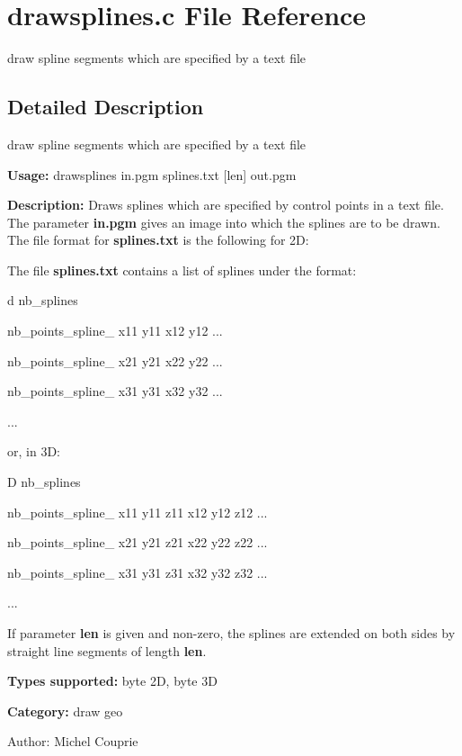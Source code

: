 \section{drawsplines.c File Reference}
\label{drawsplines_8c}
draw spline segments which are specified by a text file 



\subsection{Detailed Description}
draw spline segments which are specified by a text file 

{\bf Usage:} drawsplines in.pgm splines.txt [len] out.pgm

{\bf Description:} Draws splines which are specified by control points in a text file. The parameter {\bf in.pgm} gives an image into which the splines are to be drawn. The file format for {\bf splines.txt} is the following for 2D:

The file {\bf splines.txt} contains a list of splines under the format:\par
 d nb\_\-splines\par
 nb\_\-points\_\-spline\_ x11 y11 x12 y12 ...\par
 nb\_\-points\_\-spline\_ x21 y21 x22 y22 ...\par
 nb\_\-points\_\-spline\_ x31 y31 x32 y32 ...\par
 ...\par
 or, in 3D:\par
 D nb\_\-splines\par
 nb\_\-points\_\-spline\_ x11 y11 z11 x12 y12 z12 ...\par
 nb\_\-points\_\-spline\_ x21 y21 z21 x22 y22 z22 ...\par
 nb\_\-points\_\-spline\_ x31 y31 z31 x32 y32 z32 ...\par
 ...\par


If parameter {\bf len} is given and non-zero, the splines are extended on both sides by straight line segments of length {\bf len}.

{\bf Types supported:} byte 2D, byte 3D

{\bf Category:} draw geo

\begin{Desc}
\item[Author:]Michel Couprie \end{Desc}
